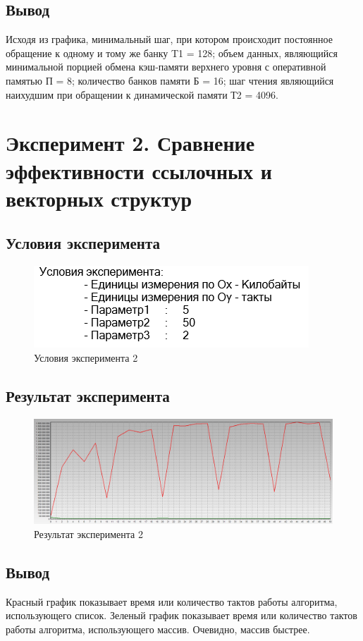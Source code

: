 \documentclass{article}
\begin{document}
\subsection{Вывод}
Исходя из графика, минимальный шаг, при котором происходит постоянное обращение к одному и тому же банку T1 = 128; 
объем данных, являющийся минимальной порцией обмена кэш-памяти верхнего уровня с оперативной памятью П = 8;
количество банков памяти Б = 16; шаг чтения являющийся наихудшим при обращении к динамической памяти Т2 = 4096.

\clearpage\section{Эксперимент 2. Сравнение эффективности ссылочных и векторных структур}
\subsection{Условия эксперимента}
\begin{figure}[h]
	\centering
	\includegraphics[scale=0.7]{tools/in_2.png}
	\caption{Условия эксперимента 2}
\end{figure}

\subsection{Результат эксперимента}
\begin{figure}[h]
	\centering
	\includegraphics[scale=0.5]{tools/exp_2.png}
	\caption{Результат эксперимента 2}
\end{figure}

\subsection{Вывод}
Красный график показывает время или количество тактов работы алгоритма, использующего список. Зеленый график 
показывает время или количество тактов работы алгоритма, использующего массив. Очевидно, массив быстрее.
\end{document}
